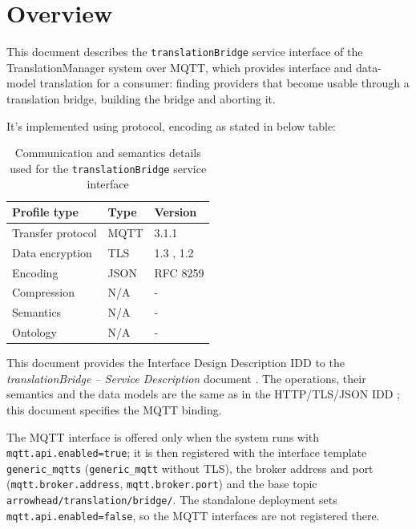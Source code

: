\documentclass[a4paper]{arrowhead}
\begin{document}
\section{Overview}
\label{sec:overview}

This document describes the \texttt{translationBridge} service interface of the TranslationManager system over MQTT, which provides interface and data-model translation for a consumer: finding providers that become usable through a translation bridge, building the bridge and aborting it.

It's implemented using protocol, encoding as stated in below table:
\begin{table}[ht!]
  \centering
  \begin{tabular}{|l|l|l|}
    \hline
    \rowcolor{gray!33} Profile type & Type & Version \\ \hline
    Transfer protocol & MQTT & 3.1.1 \cite{mqtt311} \\ \hline
    Data encryption & TLS & 1.3 \cite{rfc8446}, 1.2 \cite{rfc5246} \\ \hline
    Encoding & JSON & RFC 8259 \cite{rfc8259} \\ \hline
    Compression & N/A & - \\ \hline
    Semantics & N/A & - \\ \hline
    Ontology & N/A & - \\ \hline
  \end{tabular}
  \caption{Communication and semantics details used for the \texttt{translationBridge} service interface}
  \label{tab:comunication_semantics_profile}
\end{table}

This document provides the Interface Design Description IDD to the \textit{translationBridge -- Service Description} document \cite{tm-translationBridge-sd}.
The operations, their semantics and the data models are the same as in the HTTP/TLS/JSON IDD \cite{tm-translationBridge-http-idd}; this document specifies the MQTT binding.

The MQTT interface is offered only when the system runs with \texttt{mqtt.api.enabled=true}; it is then registered with the interface template \texttt{generic\_\allowbreak{}mqtts} (\texttt{generic\_\allowbreak{}mqtt} without TLS), the broker address and port (\texttt{mqtt.\allowbreak{}broker.\allowbreak{}address}, \texttt{mqtt.\allowbreak{}broker.\allowbreak{}port}) and the base topic \texttt{arrowhead/\allowbreak{}translation/\allowbreak{}bridge/\allowbreak{}}. The standalone deployment sets \texttt{mqtt.\allowbreak{}api.\allowbreak{}enabled=\allowbreak{}false}, so the MQTT interfaces are not registered there.
\end{document}
